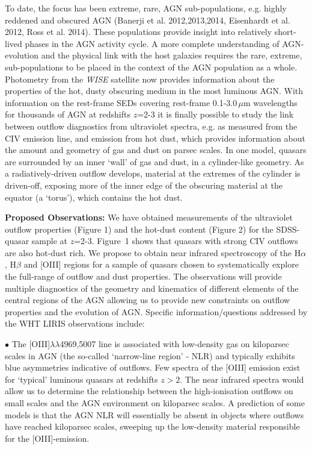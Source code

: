 To date, the focus has been extreme, rare, AGN sub-populations,
e.g. highly reddened and obscured AGN (Banerji et al. 2012,2013,2014,
Eisenhardt et al. 2012, Ross et al. 2014). These populations provide
insight into relatively short-lived phases in the AGN activity
cycle. A more complete understanding of AGN-evolution and the physical
link with the host galaxies requires the rare, extreme,
sub-populations to be placed in the context of the AGN population as a
whole. Photometry from the \textit{WISE} satellite now provides
information about the properties of the hot, dusty obscuring medium in
the most luminous AGN.  With information on the rest-frame SEDs
covering rest-frame 0.1-3.0\,$\mu$m wavelengths for thousands of AGN
at redshifts $z$=2-3 it is finally possible to study the link between
outflow diagnostics from ultraviolet spectra, e.g. as measured from
the CIV emission line, and emission from hot dust, which provides
information about the amount and geometry of gas and dust on parsec
scales. In one model, quasars are surrounded by an
inner `wall' of gas and dust, in a cylinder-like geometry. As a
radiatively-driven outflow develops, material at the extremes of the
cylinder is driven-off, exposing more of the inner edge of the
obscuring material at the equator (a `torus'), which contains the hot
dust. 

\vspace{1.5mm}

\textbf{Proposed Observations:} We have obtained measurements of the
ultraviolet outflow properties (Figure 1) and the hot-dust content
(Figure 2) for the SDSS-quasar sample at $z$=2-3.  Figure~1 shows that
quasars with strong CIV outflows are also hot-dust rich. We propose to
obtain near infrared spectroscopy of the H$\alpha$, H$\beta$ and
[OIII] regions for a sample of quasars chosen to systematically
explore the full-range of outflow and dust properties. The
observations will provide multiple diagnostics of the geometry and
kinematics of different elements of the central regions of the AGN
allowing us to provide new constraints on outflow properties and the
evolution of AGN. Specific information/questions addressed by the WHT
LIRIS observations include:

\vspace{1.5mm}

$\bullet$ The [OIII]$\lambda\lambda$4969,5007 line is associated with
low-density gas on kiloparsec scales in AGN (the so-called
`narrow-line region' - NLR) and typically exhibits blue asymmetries
indicative of outflows. Few spectra of the [OIII] emission exist for
`typical' luminous quasars at redshifts $z>2$.  The near infrared
spectra would allow us to determine the relationship between the
high-ionisation outflows on small scales and the AGN environment on
kiloparsec scales. A prediction of some models is that the AGN NLR
will essentially be absent in objects where outflows have reached
kiloparsec scales, sweeping up the low-density material responsible
for the [OIII]-emission.

